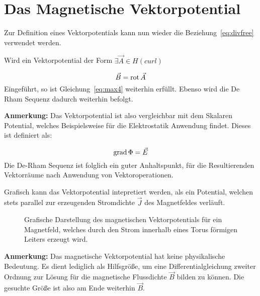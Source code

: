 \section{Das Magnetische Vektorpotential}
Zur Definition eines Vektorpotentials kann nun wieder die Beziehung~\ref{eq:divfree} verwendet werden. 
\par
Wird ein Vektorpotential der Form $\exists\vec{A}\in H(curl)$
\par
\begin{equation}
	\vec{B} = \mathrm{rot}\,\vec{A}
\end{equation}
Eingef\"uhrt, so ist Gleichung~\ref{eq:max4} weiterhin erf\"ullt. Ebenso wird die De Rham Sequenz dadurch weiterhin befolgt. 
\par
\textbf{Anmerkung:} Das Vektorpotential ist also vergleichbar mit dem Skalaren Potential, welches Beispielsweise f\"ur die Elektrostatik Anwendung findet. Dieses ist definiert als:
\par
\begin{equation}
	\mathrm{grad}\, \Phi = \vec{E}
\end{equation}
Die De-Rham Sequenz ist folglich ein guter Anhaltspunkt, f\"ur die Resultierenden Vektorr\"aume nach Anwendung von Vektoroperationen.

\newpage

Grafisch kann das Vektorpotential intepretiert werden, als ein Potential, welchen stets parallel zur erzeugenden Stromdichte $\vec{J}$ des Magnetfeldes verl\"auft.
\begin{figure}[h]
	\centering
	\def\svgwidth{0.7\textwidth}
	
	\caption{Grafische Darstellung des magnetischen Vektorpotentials f\"ur ein Magnetfeld, welches durch den Strom innerhalb eines Torus f\"ormigen Leiters erzeugt wird.}
	\label{fig:vecpot}
\end{figure}
\par
\textbf{Anmerkung:} Das magnetische Vektorpotential hat keine physikalische Bedeutung. Es dient lediglich als Hilfsgr\"o\ss{}e, um eine Differentialgleichung zweiter Ordnung zur L\"osung f\"ur die magnetische Flussdichte $\vec{B}$ bilden zu k\"onnen. Die gesuchte Gr\"o\ss{}e ist also am Ende weiterhin $\vec{B}$.

